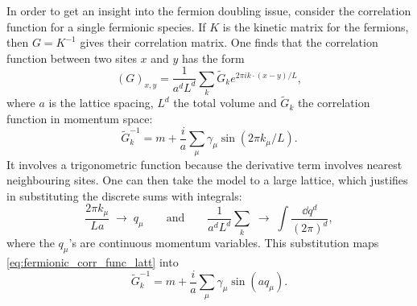In order to get an insight into the fermion doubling issue, consider the correlation function for a single fermionic species.
If $K$ is the kinetic matrix for the fermions, then $G = K^{-1}$ gives their correlation matrix.
One finds that the correlation function between two sites $x$ and $y$ has the form \cite{creutz1985book}
\begin{equation}
    (G)_{x,y} = \frac{1}{a^d L^d} \sum_{k} \tilde{G}_{k} e^{2 \pi i k \cdot (x - y) / L},
    \label{eq:fermionic_corr_func_real_space}
\end{equation}
where $a$ is the lattice spacing, $L^d$ the total volume and $\tilde{G}_k$ the correlation function in momentum space:
\begin{equation}
    \tilde{G}^{-1}_k = m + \frac{i}{a} \sum_{\mu} \gamma_{\mu} \sin(2 \pi k_{\mu} / L).
    \label{eq:fermionic_corr_func_latt}
\end{equation}
It involves a trigonometric function because the derivative term involves nearest neighbouring sites.
One can then take the model to a large lattice, which justifies in substituting the discrete sums with integrals:
\begin{equation}
    \frac{2 \pi k_{\mu}}{La}  \; \to \; q_{\mu}
    \qquad \text{and} \qquad
    \frac{1}{a^d L^d} \sum_{k} \; \to \; \int \frac{\dd q^d}{(2 \pi)^d},
    \label{eq:limit_large_lattice}
\end{equation}
where the $q_{\mu}$'s are continuous momentum variables.
This substitution maps \eqref{eq:fermionic_corr_func_latt} into
\begin{equation}
    \tilde{G}_k^{-1} = m + \frac{i}{a} \sum_{\mu} \gamma_{\mu} \sin(a q_{\mu}).
    \label{eq:fermionic_corr_func_large_latt}
\end{equation}

